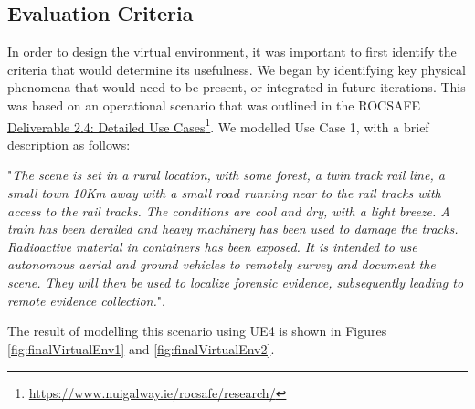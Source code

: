 
\subsection{Evaluation Criteria}\label{subsec:EvalCriteria}
In order to design the virtual environment, it was important to first identify the criteria that would determine its usefulness. We began by identifying key physical phenomena that would need to be present, or integrated in future iterations. This was based on an operational scenario that was outlined in the ROCSAFE \href{https://www.nuigalway.ie/rocsafe/research/}{Deliverable 2.4: Detailed Use Cases}\footnote{\href {https://www.nuigalway.ie/rocsafe/research/}{https://www.nuigalway.ie/rocsafe/research/}}. We modelled Use Case 1, with a brief description as follows:\par
"\textit{The scene is set in a rural location, with some forest, a twin track rail line, a small town 10Km away with a small road running near to the rail tracks with access to the rail tracks. The conditions are cool and dry, with a light breeze. A train has been derailed and heavy machinery has been used to damage the tracks. Radioactive material in containers has been exposed. It is intended to use autonomous aerial and ground vehicles to remotely survey and document the scene. They will then be used to localize forensic evidence, subsequently leading to remote evidence collection.}".\par
The result of modelling this scenario using UE4 is shown in Figures \ref{fig:finalVirtualEnv1} and \ref{fig:finalVirtualEnv2}.


